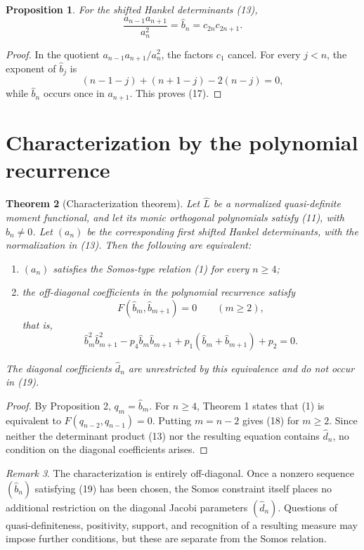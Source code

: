 \documentclass[11pt]{article}
\newtheorem{theorem}{Theorem}
\newtheorem{proposition}[theorem]{Proposition}
\theoremstyle{remark}
\newtheorem{remark}[theorem]{Remark}
\begin{document}
\begin{proposition}
For the shifted Hankel determinants (13),
\begin{equation}
\frac{a_{n-1}a_{n+1}}{a_n^2}=\widehat b_n=c_{2n}c_{2n+1}.
\end{equation}
\end{proposition}
\begin{proof}
In the quotient $a_{n-1}a_{n+1}/a_n^2$, the factors $c_1$ cancel. For every $j<n$, the exponent of $\widehat b_j$ is
\[
(n-1-j)+(n+1-j)-2(n-j)=0,
\]
while $\widehat b_n$ occurs once in $a_{n+1}$. This proves (17).
\end{proof}

\section{Characterization by the polynomial recurrence}
\begin{theorem}[Characterization theorem]
Let $\widehat L$ be a normalized quasi-definite moment functional, and let its monic orthogonal polynomials satisfy (11), with $\widehat b_n\ne0$. Let $(a_n)$ be the corresponding first shifted Hankel determinants, with the normalization in (13). Then the following are equivalent:
\begin{enumerate}
\item $(a_n)$ satisfies the Somos-type relation (1) for every $n\ge4$;
\item the off-diagonal coefficients in the polynomial recurrence satisfy
\begin{equation}
F(\widehat b_m,\widehat b_{m+1})=0\qquad(m\ge2),
\end{equation}
that is,
\begin{equation}
\widehat b_m^2\widehat b_{m+1}^2-p_4\widehat b_m\widehat b_{m+1}
+p_1(\widehat b_m+\widehat b_{m+1})+p_2=0.
\end{equation}
\end{enumerate}
The diagonal coefficients $\widehat d_n$ are unrestricted by this equivalence and do not occur in (19).
\end{theorem}
\begin{proof}
By Proposition 2, $q_m=\widehat b_m$. For $n\ge4$, Theorem 1 states that (1) is equivalent to $F(q_{n-2},q_{n-1})=0$. Putting $m=n-2$ gives (18) for $m\ge2$. Since neither the determinant product (13) nor the resulting equation contains $\widehat d_n$, no condition on the diagonal coefficients arises.
\end{proof}
\begin{remark}
The characterization is entirely off-diagonal. Once a nonzero sequence $(\widehat b_n)$ satisfying (19) has been chosen, the Somos constraint itself places no additional restriction on the diagonal Jacobi parameters $(\widehat d_n)$. Questions of quasi-definiteness, positivity, support, and recognition of a resulting measure may impose further conditions, but these are separate from the Somos relation.
\end{remark}
\end{document}

